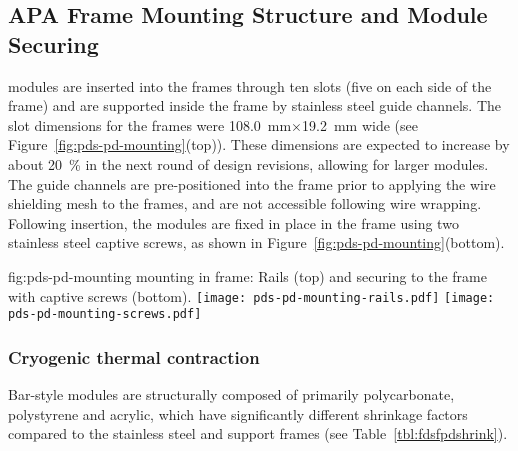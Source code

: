 \subsection{APA Frame Mounting Structure and Module Securing}	
\label{sec:fdsp-pd-assy-frames}

 modules are inserted into the  frames through ten slots 
(five on each side of the  frame) and are supported inside the frame by 
stainless steel guide channels.  The slot dimensions for the   frames 
were \SI{108.0}{mm}$\times$\SI{19.2}{mm} wide (see Figure~\ref{fig:pds-pd-mounting}(top)). These dimensions are expected to increase by about \SI{20}{\%} in the next round of  design revisions, allowing for larger  modules.   
The guide channels are pre-positioned into the  frame prior to applying the wire shielding mesh to the  frames, and are
not accessible following wire wrapping. Following insertion, the  modules are fixed in place in the  frame using
 two stainless steel captive screws, as shown in Figure~\ref{fig:pds-pd-mounting}(bottom).


\begin{dunefigure}{fig:pds-pd-mounting}
{ mounting in  frame: Rails (top) and securing to the frame with captive screws  (bottom).}
	\texttt{[image: pds-pd-mounting-rails.pdf]}
	\texttt{[image: pds-pd-mounting-screws.pdf]}
\end{dunefigure}




\subsubsection{Cryogenic thermal contraction}

Bar-style  modules are structurally composed of primarily polycarbonate, polystyrene and 
acrylic, which have significantly different shrinkage factors compared to the 
stainless steel  and  support frames (see Table~\ref{tbl:fdsfpdshrink}).

